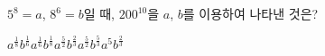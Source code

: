 $5^8=a$, $8^6=b$일 때, $200^{10}$을 $a$, $b$를 이용하여 나타낸 것은?
\begin{choices32}{$a^{\frac{1}{8}}b^{\frac{1}{6}}$}{$a^{\frac{1}{6}}b^{\frac{1}{8}}$}{$a^{\frac{5}{2}}b^{\frac{2}{3}}$}{$a^{\frac{5}{2}}b^{\frac{5}{3}}$}{$a^{5}b^{\frac{2}{3}}$}\end{choices32}
